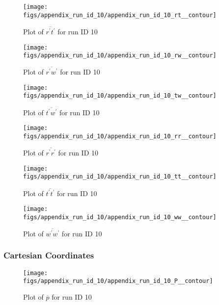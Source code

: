 \begin{figure}[H]
\centering
\texttt{[image: figs/appendix\_run\_id\_10/appendix\_run\_id\_10\_rt\_\_contour]}
\caption{Plot of $\overline{r^\prime t^\prime}$ for run ID 10}
\label{fig:appendix_run_id_10_rt__contour}
\end{figure}


\begin{figure}[H]
\centering
\texttt{[image: figs/appendix\_run\_id\_10/appendix\_run\_id\_10\_rw\_\_contour]}
\caption{Plot of $\overline{r^\prime w^\prime}$ for run ID 10}
\label{fig:appendix_run_id_10_rw__contour}
\end{figure}


\begin{figure}[H]
\centering
\texttt{[image: figs/appendix\_run\_id\_10/appendix\_run\_id\_10\_tw\_\_contour]}
\caption{Plot of $\overline{t^\prime w^\prime}$ for run ID 10}
\label{fig:appendix_run_id_10_tw__contour}
\end{figure}


\begin{figure}[H]
\centering
\texttt{[image: figs/appendix\_run\_id\_10/appendix\_run\_id\_10\_rr\_\_contour]}
\caption{Plot of $\overline{r^\prime r^\prime}$ for run ID 10}
\label{fig:appendix_run_id_10_rr__contour}
\end{figure}


\begin{figure}[H]
\centering
\texttt{[image: figs/appendix\_run\_id\_10/appendix\_run\_id\_10\_tt\_\_contour]}
\caption{Plot of $\overline{t^\prime t^\prime}$ for run ID 10}
\label{fig:appendix_run_id_10_tt__contour}
\end{figure}


\begin{figure}[H]
\centering
\texttt{[image: figs/appendix\_run\_id\_10/appendix\_run\_id\_10\_ww\_\_contour]}
\caption{Plot of $\overline{w^\prime w^\prime}$ for run ID 10}
\label{fig:appendix_run_id_10_ww__contour}
\end{figure}


\subsubsection{Cartesian Coordinates}
\begin{figure}[H]
\centering
\texttt{[image: figs/appendix\_run\_id\_10/appendix\_run\_id\_10\_P\_\_contour]}
\caption{Plot of $\overline{p}$ for run ID 10}
\label{fig:appendix_run_id_10_P__contour}
\end{figure}


